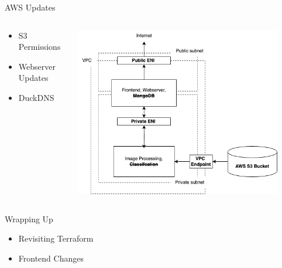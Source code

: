 
\begin{frame}{AWS Updates}
    \begin{columns}
        \begin{column}{0.3\textwidth}
            \begin{itemize}
                \item S3 Permissions
                \item Webserver Updates
                \item DuckDNS
            \end{itemize} 
        \end{column}
        \begin{column}{0.7\textwidth}
            \centering
            \includegraphics[height=0.9\textheight,width=0.9\textwidth,keepaspectratio]{images/mm_8-13-system.png}
        \end{column}
    \end{columns}
\end{frame}

\begin{frame}{Wrapping Up}
    \begin{itemize}
        \item Revisiting Terraform
        \item Frontend Changes
    \end{itemize} 
\end{frame}

